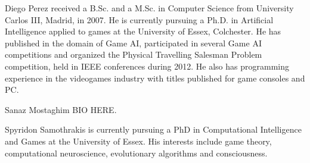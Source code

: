 \documentclass[journal]{IEEEtran}
\begin{document}
 
%


\begin{IEEEbiography}
{Diego Perez}
received a B.Sc. and a M.Sc. in Computer Science from University Carlos III, Madrid, in 2007. He is currently pursuing a Ph.D. in Artificial Intelligence applied to games at the University of Essex, Colchester. He has published in the domain of Game AI, participated in several Game AI competitions and organized the Physical Travelling Salesman Problem competition, held in IEEE conferences during 2012. He also has programming experience in the videogames industry with titles published for game consoles and PC.
\end{IEEEbiography}


\begin{IEEEbiography}
{Sanaz Mostaghim}
BIO HERE.
\end{IEEEbiography}

\begin{IEEEbiography}{Spyridon Samothrakis}
 is currently pursuing a PhD in Computational Intelligence and Games at the University of Essex. His interests include game theory, computational neuroscience, evolutionary algorithms and consciousness. 
\end{IEEEbiography}
\end{document}
